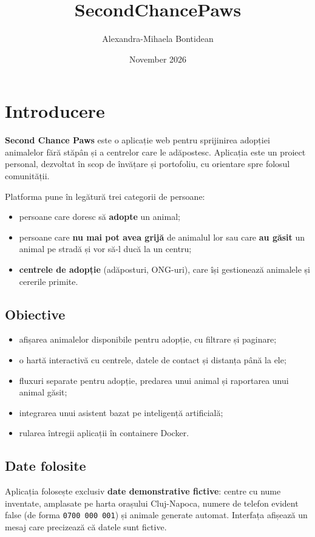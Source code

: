 \documentclass[11pt,a4paper]{article}
\title{SecondChancePaws}
\author{Alexandra-Mihaela Bontidean}
\date{November 2026}
\begin{document}
\maketitle
\tableofcontents
\newpage

\section{Introducere}

\textbf{Second Chance Paws} este o aplicație web pentru sprijinirea adopției animalelor
fără stăpân și a centrelor care le adăpostesc. Aplicația este un proiect personal,
dezvoltat în scop de învățare și portofoliu, cu orientare spre folosul comunității.

Platforma pune în legătură trei categorii de persoane:
\begin{itemize}
  \item persoane care doresc să \textbf{adopte} un animal;
  \item persoane care \textbf{nu mai pot avea grijă} de animalul lor sau care
        \textbf{au găsit} un animal pe stradă și vor să-l ducă la un centru;
  \item \textbf{centrele de adopție} (adăposturi, ONG-uri), care își gestionează
        animalele și cererile primite.
\end{itemize}

\subsection{Obiective}
\begin{itemize}
  \item afișarea animalelor disponibile pentru adopție, cu filtrare și paginare;
  \item o hartă interactivă cu centrele, datele de contact și distanța până la ele;
  \item fluxuri separate pentru adopție, predarea unui animal și raportarea unui animal găsit;
  \item integrarea unui asistent bazat pe inteligență artificială;
  \item rularea întregii aplicații în containere Docker.
\end{itemize}

\subsection{Date folosite}
Aplicația folosește exclusiv \textbf{date demonstrative fictive}: centre cu nume
inventate, amplasate pe harta orașului Cluj-Napoca, numere de telefon evident false
(de forma \texttt{0700 000 001}) și animale generate automat. Interfața afișează un
mesaj care precizează că datele sunt fictive.
\end{document}
